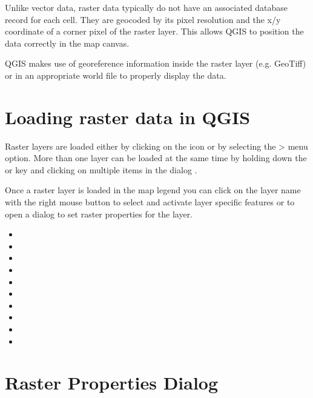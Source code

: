 Unlike vector data, raster data typically do not have an associated database
record for each cell. They are geocoded by its pixel resolution and the x/y 
coordinate of a corner pixel of the raster layer. This allows QGIS to position 
the data correctly in the map canvas. 

QGIS makes use of georeference information inside the raster layer (e.g. GeoTiff) 
or in an appropriate world file to properly display the data.
	
\section{Loading raster data in QGIS}\label{label_loadraster}

Raster layers are loaded either by clicking on the 
 icon or by
selecting the > 
menu option. More than one layer can be loaded at the same time by holding down the
 or  key and clicking on multiple items 
in the dialog .

Once a raster layer is loaded in the map legend you can click on the layer name with the 
right mouse button to select and activate layer specific features or to open 
a dialog to set raster properties for the layer.


\begin{itemize}[label=--]
\item {}
\item {}
\item {}
\item {}
\item {}
\item {}
\item {}
\item {}
\item {}
\item {}
\end{itemize}
	
\section{Raster Properties Dialog}\label{label_rasterprop}


